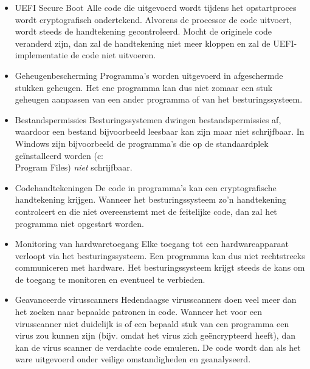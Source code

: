 \begin{itemize}
\item{UEFI Secure Boot} Alle code die uitgevoerd wordt tijdens het opstartproces wordt cryptografisch ondertekend. Alvorens de processor de code uitvoert, wordt steeds de handtekening gecontroleerd. Mocht de originele code veranderd zijn, dan zal de handtekening niet meer kloppen en zal de UEFI-implementatie de code niet uitvoeren.
\item{Geheugenbescherming} Programma's worden uitgevoerd in afgeschermde stukken geheugen. Het ene programma kan dus niet zomaar een stuk geheugen aanpassen van een ander programma of van het besturingssysteem.
\item{Bestandspermissies} Besturingssystemen dwingen bestandspermissies af, waardoor een bestand bijvoorbeeld leesbaar kan zijn maar niet schrijfbaar. In Windows zijn bijvoorbeeld de programma's die op de standaardplek ge\"installeerd worden (c:\\Program Files) \emph{niet} schrijfbaar.
\item{Codehandtekeningen} De code in programma's kan een cryptografische handtekening krijgen. Wanneer het besturingssysteem zo'n handtekening controleert en die niet overeenstemt met de feitelijke code, dan zal het programma niet opgestart worden.
\item{Monitoring van hardwaretoegang} Elke toegang tot een hardwareapparaat verloopt via het besturingssysteem. Een programma kan dus niet rechtstreeks communiceren met hardware. Het besturingssysteem krijgt steeds de kans om de toegang te monitoren en eventueel te verbieden.
\item{Geavanceerde virusscanners} Hedendaagse virusscanners doen veel meer dan het zoeken naar bepaalde patronen in code. Wanneer het voor een virusscanner niet duidelijk is of een bepaald stuk van een programma een virus zou kunnen zijn (bijv. omdat het virus zich ge\"encrypteerd heeft), dan kan de virus scanner de verdachte code emuleren. De code wordt dan als het ware uitgevoerd onder veilige omstandigheden en geanalyseerd.
\end{itemize}
